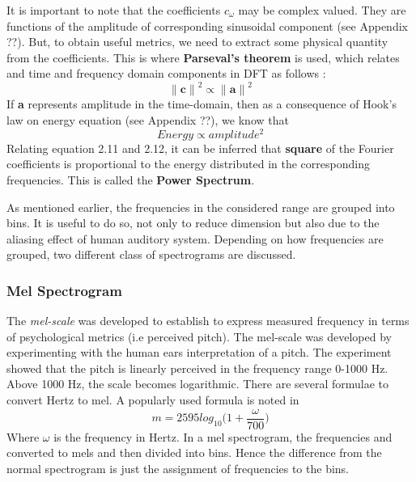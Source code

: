 It is important to note that the coefficients $c_{\omega}$ may be complex valued. They are functions of the amplitude of corresponding sinusoidal component (see Appendix ??). But, to obtain useful metrics, we need to extract some physical quantity from the coefficients. This is where \textbf{Parseval's theorem} is used, which relates and time and frequency domain components in DFT as follows \cite{allen} :
\begin{equation}
{\|\textbf{c}\|}^2 \propto {\|\textbf{a}\|}^2
\end{equation}
If \textbf{a} represents amplitude in the time-domain, then as a consequence of Hook's law  on energy equation (see Appendix ??), we know that
\begin{equation}
Energy \propto amplitude^2
\end{equation}
Relating equation 2.11 and 2.12, it can be inferred that \textbf{square} of the Fourier coefficients is proportional to the energy distributed in the corresponding frequencies. This is called the \textbf{Power Spectrum}. 
\bigskip

\noindent As mentioned earlier, the frequencies in the considered range are  grouped into bins. It is useful to do so, not only to reduce dimension but also due to the aliasing effect of human auditory system. Depending on how frequencies are grouped, two different class of spectrograms are discussed.
  
\subsubsection{Mel Spectrogram}

The \textit{mel-scale} was developed to establish to express measured frequency in terms of psychological metrics (i.e perceived pitch). The mel-scale was developed
by experimenting with the human ears interpretation of a pitch. The experiment showed that the pitch is linearly perceived in the frequency range 0-1000 Hz. Above
1000 Hz, the scale becomes logarithmic. There are several formulae to convert Hertz to mel. A popularly used formula is noted in \cite{speech}
\begin{equation}
m = 2595log_{10}\bigg(1+\frac{ \omega }{700}\bigg)
\end{equation}
Where $\omega$ is the frequency in Hertz. In a mel spectrogram, the frequencies and converted to mels and then divided into bins. Hence the difference from the normal spectrogram is just the assignment of frequencies to the bins.

